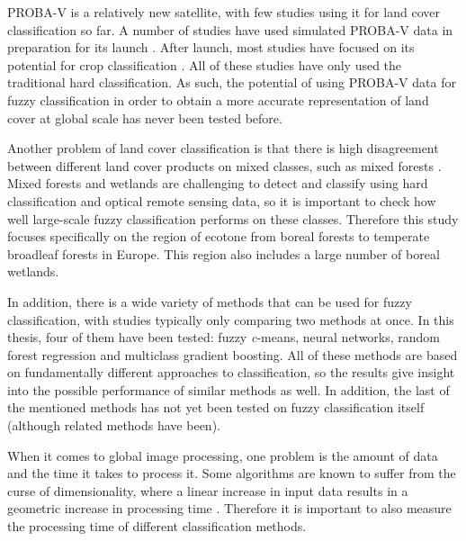 \documentclass[a4paper,12pt]{scrbook}
\begin{document}
PROBA-V is a relatively new satellite, with few studies using it for land cover classification so far. A number of studies have used simulated PROBA-V data in preparation for its launch \citep{stathakis2014probavurban,roumenina2013probavcrops,bartalev2014probavboreal}. After launch, most studies have focused on its potential for crop classification \citep{roumenina2015probavcrops,durgun2016crop,lambert2016cropland}. All of these studies have only used the traditional hard classification. As such, the potential of using PROBA-V data for fuzzy classification in order to obtain a more accurate representation of land cover at global scale has never been tested before.

Another problem of land cover classification is that there is high disagreement between different land cover products on mixed classes, such as mixed forests \citep{Herold2008lccomparison}. Mixed forests and wetlands are challenging to detect and classify using hard classification and optical remote sensing data, so it is important to check how well large-scale fuzzy classification performs on these classes. Therefore this study focuses specifically on the region of ecotone from boreal forests to temperate broadleaf forests in Europe. This region also includes a large number of boreal wetlands. 

In addition, there is a wide variety of methods that can be used for fuzzy classification, with studies typically only comparing two methods at once. In this thesis, four of them have been tested: fuzzy \textit{c}-means, neural networks, random forest regression and multiclass gradient boosting. All of these methods are based on fundamentally different approaches to classification, so the results give insight into the possible performance of similar methods as well. In addition, the last of the mentioned methods has not yet been tested on fuzzy classification itself (although related methods have been).

When it comes to global image processing, one problem is the amount of data and the time it takes to process it. Some algorithms are known to suffer from the curse of dimensionality, where a linear increase in input data results in a geometric increase in processing time \citep{walton2008subpixelrf}. Therefore it is important to also measure the processing time of different classification methods.
\end{document}
